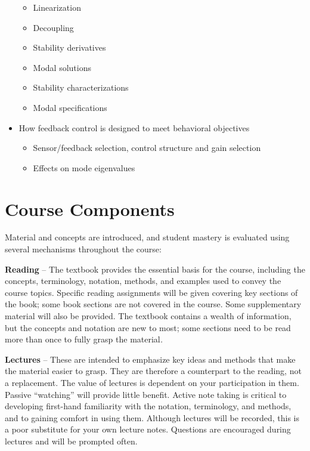 \documentclass[9pt]{article}
\begin{document}
\begin{itemize}[nosep]
\begin{itemize}[nosep]
    \item Linearization
    \item Decoupling
    \item Stability derivatives
    \item Modal solutions
    \item Stability characterizations
    \item Modal specifications
  \end{itemize}
\item How feedback control is designed to meet behavioral objectives
    \begin{itemize}[nosep]
    \item Sensor/feedback selection, control structure and gain selection
    \item Effects on mode eigenvalues
  \end{itemize}
\end{itemize}

\section*{Course Components}\label{course-components}

Material and concepts are introduced, and student mastery is evaluated
using several mechanisms throughout the course:

\textbf{Reading} -- The textbook provides the essential basis for the
course, including the concepts, terminology, notation, methods, and
examples used to convey the course topics. Specific reading assignments
will be given covering key sections of the book; some book sections are
not covered in the course. Some supplementary material will also be
provided. {The textbook contains a wealth of information, but the
concepts and notation are new to most; some sections need to be read
more than once to fully grasp the material}\emph{.}

\textbf{Lectures} -- These are intended to emphasize key ideas and
methods that make the material easier to grasp. They are therefore a
counterpart to the reading, not a replacement. {The value of lectures is
dependent on your participation in them}. Passive ``watching'' will
provide little benefit. {Active note taking is critical to developing
first-hand familiarity with the notation, terminology, and methods, and
to gaining comfort in using them}. Although lectures will be recorded,
this is a poor substitute for your own lecture notes. Questions are
encouraged during lectures and will be prompted often.
\end{document}
